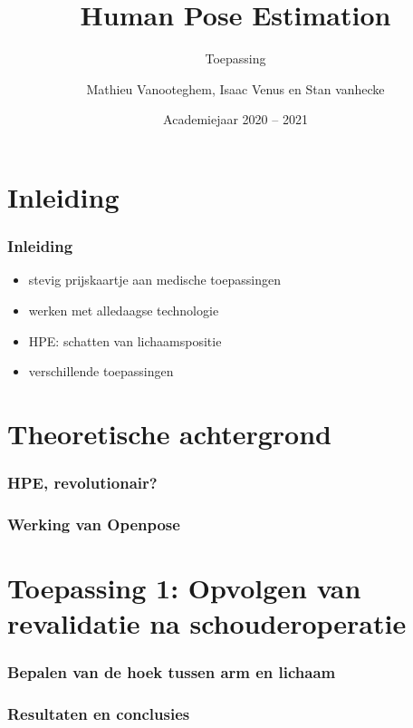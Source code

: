 \documentclass
   [kulak] %
   {kulakbeamer}
\title[Korte titel]{Human Pose Estimation}
\subtitle{Toepassing}
\author[Korte naam]{Mathieu Vanooteghem, Isaac Venus en Stan vanhecke}
\institute[Kulak]{KU Leuven Kulak}
\date{Academiejaar 2020 -- 2021}
\begin{document}
\begin{titleframe}
\titlepage
\end{titleframe}

\begin{outlineframe}[Overzicht]
\tableofcontents
\end{outlineframe}


\section{Inleiding}

\begin{frame}
\frametitle{Inleiding}
	\begin{itemize}
		\item stevig prijskaartje aan medische toepassingen
		\item werken met alledaagse technologie
		\item HPE: schatten van lichaamspositie
		\item verschillende toepassingen
	\end{itemize}
\end{frame}



\section[Korte titel]{Theoretische achtergrond}

\begin{frame}
\frametitle{HPE, revolutionair?}
\end{frame}

\begin{frame}
\frametitle{Werking van Openpose}
\end{frame}



\section{Toepassing 1: Opvolgen van revalidatie na schouderoperatie}

\begin{frame}
\frametitle{Bepalen van de hoek tussen arm en lichaam}
\end{frame}

\begin{frame}
\frametitle{Resultaten en conclusies}
\end{frame}
\end{document}
